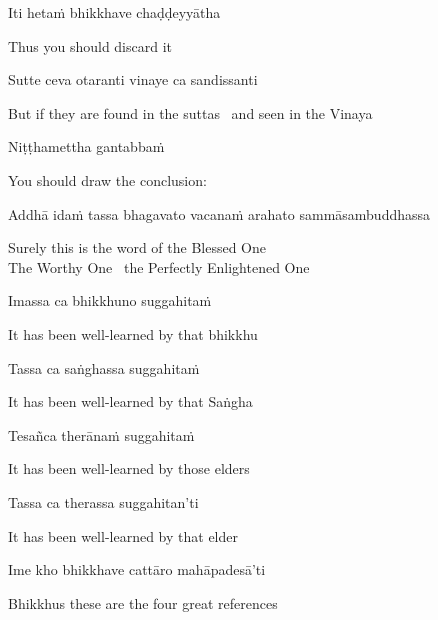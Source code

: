 Iti hetaṁ bhikkhave chaḍḍeyyātha

\begin{english}
  Thus you should discard it
\end{english}

Sutte ceva otaranti vinaye ca sandissanti

\begin{english}
  But if they are found in the suttas \breathmark\ and seen in the Vinaya
\end{english}

Niṭṭhamettha gantabbaṁ

\begin{english}
  You should draw the conclusion:
\end{english}

\begin{pali-hang}
  Addhā idaṁ tassa bhagavato vacanaṁ arahato sammāsambuddhassa
\end{pali-hang}

\begin{english}
  Surely this is the word of the Blessed One\\
  The Worthy One \breathmark\ the Perfectly Enlightened One
\end{english}

Imassa ca bhikkhuno suggahitaṁ

\begin{english}
  It has been well-learned by that bhikkhu
\end{english}

Tassa ca saṅghassa suggahitaṁ

\begin{english}
  It has been well-learned by that Saṅgha
\end{english}

Tesañca therānaṁ suggahitaṁ

\begin{english}
  It has been well-learned by those elders
\end{english}

Tassa ca therassa suggahitan'ti

\begin{english}
  It has been well-learned by that elder
\end{english}

Ime kho bhikkhave cattāro mahāpadesā'ti

\begin{english}
  Bhikkhus these are the four great references
\end{english}

